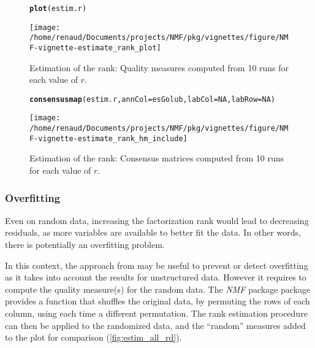 \documentclass[a4paper]{article}\usepackage[]{graphicx}\usepackage[]{color}
\makeatletter
\def\maxwidth{ %
  \ifdim\Gin@nat@width>\linewidth
    \linewidth
  \else
    \Gin@nat@width
  \fi
}
\newcommand{\hlnum}[1]{\textcolor[rgb]{0.686,0.059,0.569}{#1}}%
\newcommand{\hlstd}[1]{\textcolor[rgb]{0.345,0.345,0.345}{#1}}%
\newcommand{\hlkwc}[1]{\textcolor[rgb]{0.333,0.667,0.333}{#1}}%
\newcommand{\hlkwd}[1]{\textcolor[rgb]{0.737,0.353,0.396}{\textbf{#1}}}%
\newenvironment{kframe}{%
 \def\at@end@of@kframe{}%
 \ifinner\ifhmode%
  \def\at@end@of@kframe{\end{minipage}}%
  \begin{minipage}{\columnwidth}%
 \fi\fi%
 \def\FrameCommand##1{\hskip\@totalleftmargin \hskip-\fboxsep
 \colorbox{shadecolor}{##1}\hskip-\fboxsep
     \hskip-\linewidth \hskip-\@totalleftmargin \hskip\columnwidth}%
 \MakeFramed {\advance\hsize-\width
   \@totalleftmargin\z@ \linewidth\hsize
   \@setminipage}}%
 {\par\unskip\endMakeFramed%
 \at@end@of@kframe}
\newenvironment{knitrout}{}{} %
\newcommand{\pkgname}[1]{\textit{#1}\xspace}
\newcommand{\Rpkg}[1]{\pkgname{#1} package\xspace}
\newcommand{\nmfpack}{\Rpkg{NMF}}
\renewcommand{\cite}[1]{\parencite{#1}}
\makeatother
\begin{document}
\begin{figure}
\begin{knitrout}
\color{fgcolor}\begin{kframe}
\begin{alltt}
\hlkwd{plot}\hlstd{(estim.r)}
\end{alltt}
\end{kframe}
\texttt{[image: /home/renaud/Documents/projects/NMF/pkg/vignettes/figure/NMF-vignette-estimate\_rank\_plot]} 

\end{knitrout}
\caption{Estimation of the rank: Quality measures computed from 10 runs for each value of $r$. \label{fig:estim_all}}
\end{figure}

\begin{figure}
\begin{knitrout}
\color{fgcolor}\begin{kframe}
\begin{alltt}
\hlkwd{consensusmap}\hlstd{(estim.r,} \hlkwc{annCol}\hlstd{=esGolub,} \hlkwc{labCol}\hlstd{=}\hlnum{NA}\hlstd{,} \hlkwc{labRow}\hlstd{=}\hlnum{NA}\hlstd{)}
\end{alltt}
\end{kframe}
\texttt{[image: /home/renaud/Documents/projects/NMF/pkg/vignettes/figure/NMF-vignette-estimate\_rank\_hm\_include]} 

\end{knitrout}
\caption{Estimation of the rank: Consensus matrices computed from 10 runs for each value of $r$. \label{fig:estim_all_hm}}
\end{figure}

\subsubsection{Overfitting}
Even on random data, increasing the factorization rank would lead to decreasing residuals, as more variables are available to better fit the data.
In other words, there is potentially an overfitting problem. 
 
In this context, the approach from \cite{Frigyesi2008} may be useful to prevent or detect overfitting as it takes into account the results for unstructured data.
However it requires to compute the quality measure(s) for the random data.
The \nmfpack package provides a function that shuffles the original data, by permuting the rows of each column, using each time a different permutation.
The rank estimation procedure can then be applied to the randomized data, and the ``random'' measures added to the plot for comparison (\cref{fig:estim_all_rd}).
\end{document}
